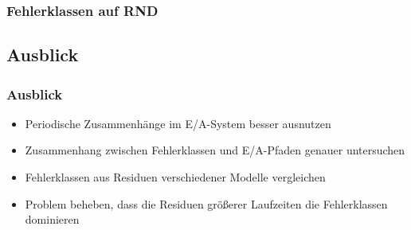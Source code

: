 \documentclass{beamer}
\begin{document}
\begin{frame}
	\frametitle{Fehlerklassen auf RND}
	\begin{table}
	\end{table}
\end{frame}

\subsection*{Ausblick}
\begin{frame}
	\frametitle{Ausblick}
	\begin{itemize}
		\item Periodische Zusammenhänge im E/A-System besser ausnutzen
		\item Zusammenhang zwischen Fehlerklassen und E/A-Pfaden genauer untersuchen
		\item Fehlerklassen aus Residuen verschiedener Modelle vergleichen
		\item Problem beheben, dass die Residuen größerer Laufzeiten die Fehlerklassen dominieren
	\end{itemize}	
\end{frame}
\end{document}
